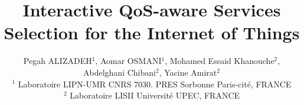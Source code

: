\documentclass[10pt,journal,compsoc]{IEEEtran}
\begin{document}
%
\title{Interactive QoS-aware Services Selection for the Internet of Things}
%
%
%
%


\author{\small{Pegah ALIZADEH$^{1}$, Aomar OSMANI$^{1}$, Mohamed Essaid Khanouche$^{2}$, Abdelghani Chibani$^{2}$, Yacine Amirat$^{2}$ \\
$^{1}$ Laboratoire LIPN-UMR CNRS 7030. PRES Sorbonne Paris-cit\'e, FRANCE \\    
$^{2}$ Laboratoire LISII  Universit\'e UPEC, FRANCE \\
}}

\end{document}
